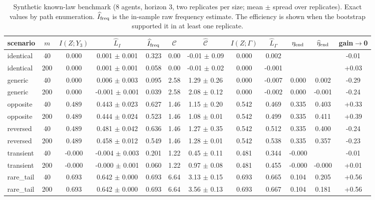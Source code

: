 \documentclass[10pt]{article}
\begin{document}
\begin{table}[htbp]
\centering
\scriptsize
\caption{Synthetic known-law benchmark (8 agents, horizon 3, two replicates per size; mean $\pm$ spread over replicates). Exact values by path enumeration. $\widehat I_{\rm freq}$ is the in-sample raw frequency estimate. The efficiency is shown when the bootstrap supported it in at least one replicate.}\label{tab:synthetic}
\begin{tabular}{l c cc c cc cc cc c}
\toprule
scenario & $m$ & $I(Z;Y_3)$ & $\widehat L_I$ & $\widehat I_{\rm freq}$ & $\mathcal C$ & $\widehat{\mathcal C}$ & $I(Z;\Gamma)$ & $\widehat L_\Gamma$ & $\eta_{\rm end}$ & $\widehat\eta_{\rm end}$ & gain$\to$0 \\
\midrule
identical & 40 & 0.000 & 0.001 $\pm$ 0.001 & 0.323 & 0.00 & -0.01 $\pm$ 0.09 & 0.000 & 0.002 &  &  & -0.01 \\
identical & 200 & 0.000 & 0.001 $\pm$ 0.001 & 0.058 & 0.00 & -0.01 $\pm$ 0.02 & 0.000 & -0.001 &  &  & +0.03 \\
generic & 40 & 0.000 & 0.006 $\pm$ 0.003 & 0.095 & 2.58 & 1.29 $\pm$ 0.26 & 0.000 & -0.007 & 0.000 & 0.002 & -0.29 \\
generic & 200 & 0.000 & -0.001 $\pm$ 0.001 & 0.039 & 2.58 & 2.08 $\pm$ 0.12 & 0.000 & -0.002 & 0.000 & -0.001 & -0.24 \\
opposite & 40 & 0.489 & 0.443 $\pm$ 0.023 & 0.627 & 1.46 & 1.15 $\pm$ 0.20 & 0.542 & 0.469 & 0.335 & 0.403 & +0.33 \\
opposite & 200 & 0.489 & 0.444 $\pm$ 0.024 & 0.523 & 1.46 & 1.08 $\pm$ 0.01 & 0.542 & 0.499 & 0.335 & 0.411 & +0.39 \\
reversed & 40 & 0.489 & 0.481 $\pm$ 0.042 & 0.636 & 1.46 & 1.27 $\pm$ 0.35 & 0.542 & 0.512 & 0.335 & 0.400 & -0.24 \\
reversed & 200 & 0.489 & 0.458 $\pm$ 0.012 & 0.549 & 1.46 & 1.28 $\pm$ 0.01 & 0.542 & 0.538 & 0.335 & 0.357 & -0.23 \\
transient & 40 & -0.000 & -0.004 $\pm$ 0.003 & 0.201 & 1.22 & 0.45 $\pm$ 0.11 & 0.481 & 0.344 & -0.000 &  & -0.01 \\
transient & 200 & -0.000 & -0.000 $\pm$ 0.001 & 0.060 & 1.22 & 0.97 $\pm$ 0.08 & 0.481 & 0.455 & -0.000 & -0.000 & +0.01 \\
rare\_tail & 40 & 0.693 & 0.642 $\pm$ 0.000 & 0.693 & 6.64 & 3.13 $\pm$ 0.15 & 0.693 & 0.665 & 0.104 & 0.205 & +0.56 \\
rare\_tail & 200 & 0.693 & 0.642 $\pm$ 0.000 & 0.693 & 6.64 & 3.56 $\pm$ 0.13 & 0.693 & 0.667 & 0.104 & 0.181 & +0.56 \\
\bottomrule
\end{tabular}
\end{table}
\end{document}
